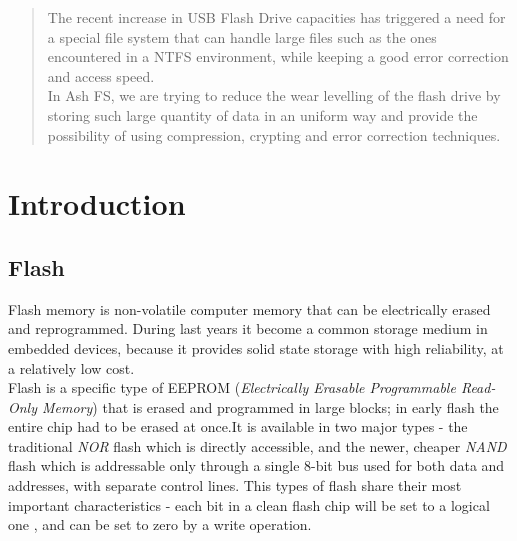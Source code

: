 \documentclass[conference]{IEEEtran}
\begin{document}
\begin{abstract}
The recent increase in USB Flash Drive capacities has triggered a need for a special
file system that can handle large files such as the ones encountered in a NTFS environment,
while keeping a good error correction and access speed.\\

In Ash FS, we are trying to reduce the wear levelling of the flash drive by storing such
large quantity of data in an uniform way and provide the possibility of using compression,
crypting and error correction techniques.\\

\end{abstract}


%

\section{Introduction}
\subsection{Flash}


Flash memory is non-volatile computer memory that can be electrically erased and reprogrammed.
During last years it become a common storage medium in embedded devices, because it 
provides solid state storage with high reliability, at a relatively low cost.\\

Flash is a specific type of EEPROM ({\em Electrically Erasable Programmable Read-Only Memory})
that is erased and programmed in large blocks; in early flash the entire chip had to be
erased at once.It is available in two major types - the traditional {\em NOR} flash which 
is directly accessible, and the newer, cheaper {\em NAND} flash which is addressable only 
through a single 8-bit bus used for both data and addresses, with separate control lines.
This types of flash share their most important characteristics - each bit in a clean 
flash chip will be set to a logical one , and can be set to zero by a write operation. \\
\end{document}
